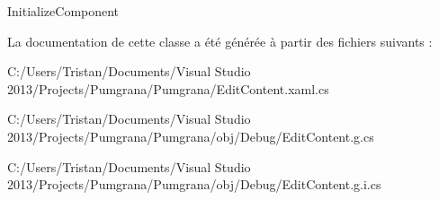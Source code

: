 Initialize\+Component 



La documentation de cette classe a été générée à partir des fichiers suivants \+:\begin{DoxyCompactItemize}
\item 
C\+:/\+Users/\+Tristan/\+Documents/\+Visual Studio 2013/\+Projects/\+Pumgrana/\+Pumgrana/Edit\+Content.\+xaml.\+cs\item 
C\+:/\+Users/\+Tristan/\+Documents/\+Visual Studio 2013/\+Projects/\+Pumgrana/\+Pumgrana/obj/\+Debug/Edit\+Content.\+g.\+cs\item 
C\+:/\+Users/\+Tristan/\+Documents/\+Visual Studio 2013/\+Projects/\+Pumgrana/\+Pumgrana/obj/\+Debug/Edit\+Content.\+g.\+i.\+cs\end{DoxyCompactItemize}

